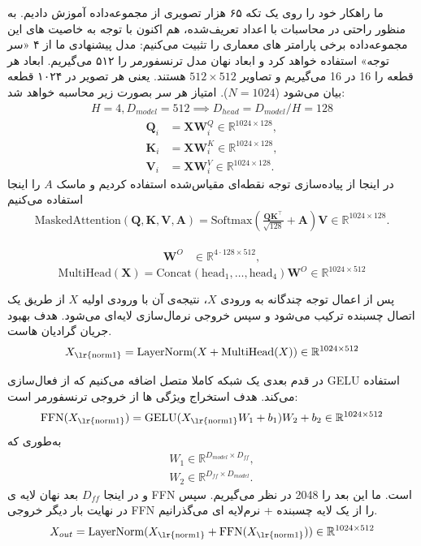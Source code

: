 ما راهکار خود را روی یک تکه ۶۵ هزار تصویری از مجموعه‌داده 
\cite{danbooru2019Portraits}
آموزش دادیم. به منظور راحتی در محاسبات با اعداد تعریف‌شده، هم اکنون با توجه به خاصیت های این مجموعه‌داده برخی پارامتر های معماری را تثبیت می‌کنیم:
مدل پیشنهادی ما از ۴‌ «سر توجه» استفاده خواهد کرد و ابعاد نهان مدل ترنسفورمر را ۵۱۲ می‌گیریم. ابعاد هر قطعه را 16 در 16 می‌گیریم و تصاویر $ 512 \times 512 $ هستند. یعنی هر تصویر در ۱۰۲۴ قطعه بیان می‌شود ($N = 1024 $). 
امتیاز هر سر بصورت زیر محاسبه خواهد شد:
\begin{align*}
	H = 4, D_{model} = 512 \implies
	D_{head} = D_{model} / H = 128
\end{align*}
\begin{align*}
	\mathbf{Q}_i &= \mathbf{X} \mathbf{W}_i^Q \in \mathbb{R}^{1024 \times 128}, \\
	\mathbf{K}_i &= \mathbf{X} \mathbf{W}_i^K \in \mathbb{R}^{1024 \times 128}, \\
	\mathbf{V}_i &= \mathbf{X} \mathbf{W}_i^V \in \mathbb{R}^{1024 \times 128}.
\end{align*}
در اینجا از پیاده‌سازی توجه نقطه‌ای مقیاس‌شده استفاده کردیم  و ماسک $A$ را اینجا استفاده می‌کنیم
\begin{align}
	\text{MaskedAttention}(\mathbf{Q}, \mathbf{K}, \mathbf{V},  \mathbf{A}) =
	\text{Softmax}\left(\frac{\mathbf{Q} \mathbf{K}^\top}{\sqrt{128}} + \mathbf{A} \right) \mathbf{V} \in \mathbb{R}^{1024 \times 128}.
\end{align}


\begin{align*}
	\mathbf{W}^O & \in  \mathbb{R}^{4 \cdot 128 \times 512},
\end{align*}
$$
\text{MultiHead}(\mathbf{X}) = \text{Concat}(\text{head}_1, \dots, \text{head}_4)\mathbf{W}^O \in \mathbb{R}^{1024 \times 512}
$$

پس از اعمال توجه چندگانه به ورودی $X$، نتیجه‌ی آن با ورودی اولیه $X$ از طریق یک اتصال چسبنده ترکیب می‌شود و سپس خروجی نرمال‌سازی لایه‌ای می‌شود. هدف بهبود جریان گرادیان هاست. 
$$
X_{\text{\lr{norm1}}} = \text{LayerNorm}(X + \text{MultiHead}(X)) \in \mathbb{R}^{1024 \times 512}
$$

در قدم بعدی یک شبکه کاملا متصل اضافه می‌کنیم که از فعال‌سازی GELU استفاده می‌کند. هدف استخراج ویژگی ها از خروجی ترنسفورمر است:
$$
\text{FFN}(X_{\text{\lr{norm1}}}) = \text{GELU}(X_{\text{\lr{norm1}}} W_1 + b_1) W_2 + b_2 \in \mathbb{R}^{1024 \times 512}
$$
به‌طوری که 
\begin{align*}
W_1 \in \mathbb{R}^{D_{model} \times D_{ff}},\\
W_2 \in \mathbb{R}^{D_{ff} \times D_{model}}.
\end{align*}
و در اینجا $D_{ff}$ بعد نهان لایه ی FFN است. ما این بعد را 2048 در نظر می‌گیریم. سپس در نهایت بار دیگر خروجی FFN را از یک لایه چسبنده +‌ نرم‌لایه ای می‌گذرانیم.
$$
X_{out} = \text{LayerNorm}(X_{\text{\lr{norm1}}} + \text{FFN}(X_{\text{\lr{norm1}}})) \in \mathbb{R}^{1024 \times 512}
$$

